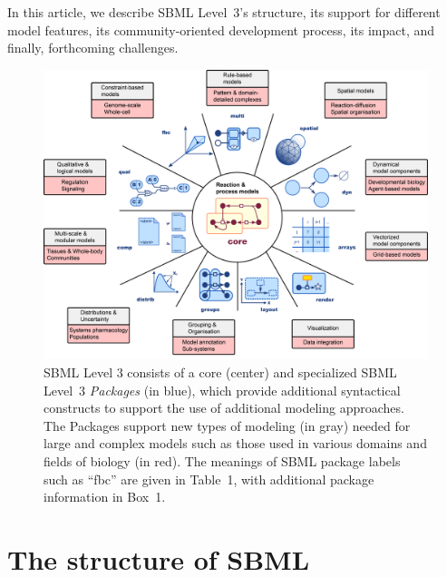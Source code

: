 \documentclass[]{draft-sbml-paper}
\begin{document}
In this article, we describe SBML Level~3's structure, its support for different model features, its community-oriented development process, its impact, and finally, forthcoming challenges.

\begin{figure}[b]
  \center
  \includegraphics[width=\textwidth]{res/SBML-Level3-v08.png}
\caption{SBML Level 3 consists of a core (center) and specialized SBML Level~3 \emph{Packages} (in blue), which provide additional syntactical constructs to support the use of additional modeling approaches. The Packages support new types of modeling (in gray) needed for large and complex models such as those used in various domains and fields of biology (in red). The meanings of SBML package labels such as ``fbc'' are given in Table~1, with additional package information in Box~1.}
\label{level-3-diagram}
\end{figure}

\clearpage
\newpage

\section*{The structure of SBML}
\label{sec:sbml}
\end{document}

